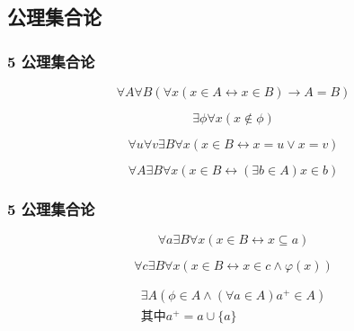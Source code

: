 \documentclass{beamer}
\begin{document}
\begin{CJK*}{UTF8}{gbsn}
\section{公理集合论}
\begin{frame}
  \frametitle{5 公理集合论}
  \begin{Ax}[外延公理]
    \begin{equation*}
      \forall A \forall B (\forall x (x \in A \leftrightarrow x\in B)\rightarrow A = B)
    \end{equation*}
  \end{Ax}
  \begin{Ax}[空集公理]
    \begin{equation*}
      \exists \phi \forall x (x \notin \phi)
    \end{equation*}
  \end{Ax}
  \begin{Ax}[对公理]
    \begin{equation*}
      \forall u \forall v \exists B \forall x (x \in B \leftrightarrow x = u \lor x = v)
    \end{equation*}
  \end{Ax}
  \begin{Ax}[并集公理]
    \begin{equation*}
     \forall A \exists B \forall x (x \in B \leftrightarrow (\exists b \in A) x \in b)
    \end{equation*}
  \end{Ax}
\end{frame}
\begin{frame}
  \frametitle{5 公理集合论}
    \begin{Ax}[幂集公理]
    \begin{equation*}
      \forall a \exists B \forall x ( x \in B \leftrightarrow x \subseteq a)
    \end{equation*}
  \end{Ax}
  \begin{Ax}[子集公理]
    \begin{equation*}
      \forall c \exists B \forall x (x \in B \leftrightarrow x \in c \land \varphi(x))
    \end{equation*}
  \end{Ax}
  \begin{Ax}[无穷公理]
    \begin{equation*}
      \begin{split}
      \exists A ( \phi \in A \land (\forall a \in A) a^+ \in A)\\
      \text{其中} a^+ = a \cup \{a\}
      \end{split}
    \end{equation*}
  \end{Ax}
\end{frame}


\end{CJK*}
\end{document}

